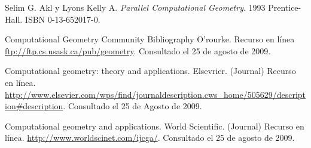 \documentclass[final, 12pt letterpaper]{article}
\begin{document}
\begin{thebibliography}{20}
Selim G. Akl y Lyons Kelly A. \emph{Parallel Computational Geometry}. 1993 Prentice-Hall. ISBN 0-13-652017-0.

Computational Geometry Community Bibliography O'rourke. Recurso en línea
\newblock \url{ftp://ftp.cs.usask.ca/pub/geometry}. Consultado el 25 de agosto de 2009.

Computational geometry: theory and applications. Elsevrier. (Journal) Recurso en línea.
\newblock \url{http://www.elsevier.com/wps/find/journaldescription.cws_home/505629/description#description}. Consultado el 25 de Agosto de 2009.

Computational geometry and applications. World Scientific. (Journal) Recurso en línea. 
\newblock \url{http://www.worldscinet.com/ijcga/}. Consultado el 25 de agosto de 2009.

\end{thebibliography}
\end{document}
